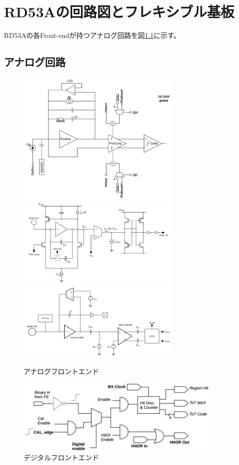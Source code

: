 \chapter{RD53Aの回路図とフレキシブル基板} \label{chap:rd53a_circit}
RD53Aの各Front-endが持つアナログ回路を図\ref{analog_fe}に示す。

\section{アナログ回路}
\begin{figure}[bpt]
  \begin{center}
    \includegraphics[width=8cm]{./diff_fe.png}
    \includegraphics[width=8cm]{./lin_fe.png}
    \includegraphics[width=8cm]{./syn_fe.png}
  \caption[アナログフロントエンド]{アナログフロントエンド\cite{2-1}}
  \label{analog_fe}
  \end{center}
\end{figure}

\begin{figure}[bpt]\centering
\includegraphics[width=10cm]{./digital_fe.png}
\caption[デジタルフロントエンド]{デジタルフロントエンド\cite{2-1}}
\label{digital_fe}
\end{figure}

